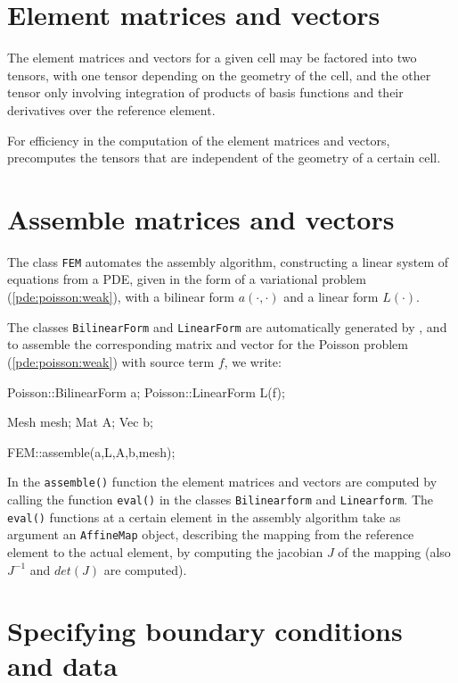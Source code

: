 \section{Element matrices and vectors} 

The element matrices and vectors for a given cell may be factored 
into two tensors, with one tensor depending on the geometry of the cell, 
and the other tensor only involving integration of products of 
basis functions and their derivatives over the reference element.  

For efficiency in the computation of the element matrices 
and vectors, \ffc{} precomputes the tensors that are independent of 
the geometry of a certain cell. 

\section{Assemble matrices and vectors}

The class \texttt{FEM} automates the assembly algorithm, constructing a linear 
system of equations from a PDE, 
given in the form of a variational problem (\ref{pde:poisson:weak}), 
with a bilinear form $a(\cdot,\cdot)$ and a linear form $L(\cdot)$. 

The classes \texttt{BilinearForm} and \texttt{LinearForm} are automatically 
generated by \ffc{}, and to assemble the corresponding matrix and vector for 
the Poisson problem (\ref{pde:poisson:weak}) with source term $f$, we write:  
\begin{code}
Poisson::BilinearForm a;
Poisson::LinearForm L(f);

Mesh mesh; 
Mat A;
Vec b;

FEM::assemble(a,L,A,b,mesh);
\end{code}

In the \texttt{assemble()} function the element matrices and vectors are 
computed by calling the function \texttt{eval()} in the classes 
\texttt{Bilinearform} and \texttt{Linearform}. 
The \texttt{eval()} functions at a certain element in the assembly algorithm 
take as argument an \texttt{AffineMap} object, 
describing the mapping from the reference element to the actual element, 
by computing the jacobian $J$ of the mapping (also $J^{-1}$ and $det(J)$ 
are computed).  

\section{Specifying boundary conditions and data}

